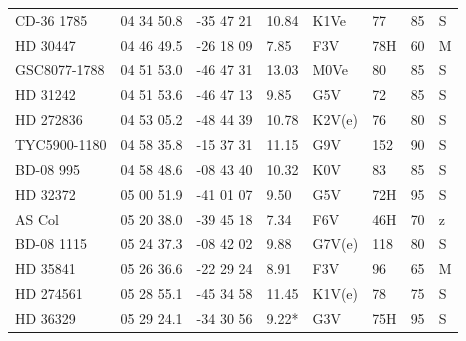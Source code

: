 \documentclass[11pt,twoside]{book}
\begin{document}
\begin{table}[]
{\begin{tabular}{lcclllr@{\hskip7pt}l}
CD-36 1785   &04 34 50.8&    -35 47 21 &     10.84&      K1Ve &\hspace{2mm}77&85&S\\
HD 30447     &04 46 49.5&    -26 18 09&\hspace{2mm}7.85&F3V&\hspace{2mm}78H&60&M   \\
GSC8077-1788   &04 51 53.0&    -46 47 31&      13.03&      M0Ve  &\hspace{2mm}80&85&S\\
HD 31242     &04 51 53.6&    -46 47 13&       \hspace{2mm}9.85&      G5V  &\hspace{2mm}72&85&S\\
HD 272836    &04 53 05.2&    -48 44 39&      10.78 &         K2V(e) &\hspace{2mm}76&80&S\\
TYC5900-1180 &04 58 35.8&    -15 37 31&      11.15 &         G9V&   152& 90  &S\\
BD-08 995    &04 58 48.6&   -08 43 40&       10.32&          K0V    &\hspace{2mm}83&85  &S\\
HD 32372    &05 00 51.9&    -41 01 07&       \hspace{2mm}9.50&      G5V  &\hspace{2mm}72H&95&S\\
AS Col      &05 20 38.0&    -39 45 18&        \hspace{2mm}7.34&    F6V  &\hspace{2mm}46H&70&z\\
BD-08 1115  &05 24 37.3&    -08 42 02&      \hspace{2mm}9.88&      G7V(e)&118&80 &S\\
HD 35841    &05 26 36.6&     -22 29 24&   \hspace{2mm}8.91& F3V  &\hspace{2mm}96&65&M\\
HD 274561   &05 28 55.1&    -45 34 58&    11.45 &       K1V(e)  &\hspace{2mm}78&75&S\\
HD 36329    &05 29 24.1&    -34 30 56 &       \hspace{2mm}9.22*&      G3V  &\hspace{2mm}75H&95&S\\

\end{tabular}}
\end{table}
\end{document}
